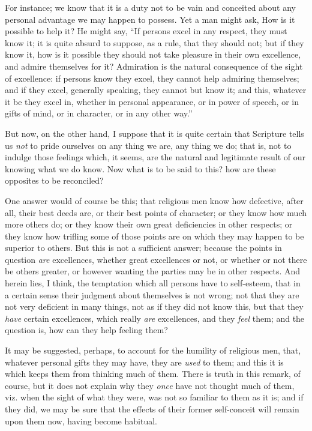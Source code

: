 For instance; we know that it is a duty not to be vain and
conceited about any personal advantage we may happen to possess. Yet a
man might ask, How is it possible to help it? He might say, ``If
persons excel in any respect, they must know it; it is quite absurd to
suppose, as a rule, that they should not; but if they know it, how is
it possible they should not take pleasure in their own excellence, and
admire themselves for it? Admiration is the natural consequence of the
sight of excellence: if persons know they excel, they cannot help
admiring themselves; and if they excel, generally speaking, they
cannot but know it; and this, whatever it be they excel in, whether in
personal appearance, or in power of speech, or in gifts of mind, or in
character, or in any other way.''

But now, on the other hand, I suppose that it is quite certain that
Scripture tells us \emph{not} to pride ourselves on any thing we are,
any thing we do; that is, not to indulge those feelings which, it
seems, are the natural and legitimate result of our knowing what we do
know. Now what is to be said to this? how are these opposites to be
reconciled?

One answer would of course be this; that religious men know how
defective, after all, their best deeds are, or their best points of
character; or they know how much more others do; or they know their
own great deficiencies in other respects; or they know how trifling
some of those points are on which they may happen to be superior to
others. But this is not a sufficient answer; because the points in
question \emph{are} excellences, whether great excellences or not, or whether
or not there be others greater, or however wanting the parties may be
in other respects. And herein lies, I think, the temptation which all
persons have to self-esteem, that in a certain sense their judgment
about themselves is not wrong; not that they are not very deficient in
many things, not as if they did not know this, but that they \emph{have}
certain excellences, which really \emph{are} excellences, and they \emph{feel}
them; and the question is, how can they help feeling them?

It may be suggested, perhaps, to account for the humility of
religious men, that, whatever personal gifts they may have, they are \emph{used}
to them; and this it is which keeps them from thinking much of them.
There is truth in this remark, of course, but it does not explain why
they \emph{once} have not thought much of them, viz. when the sight of
what they were, was not so familiar to them as it is; and if they did,
we may be sure that the effects of their former self-conceit will
remain upon them now, having become habitual.

